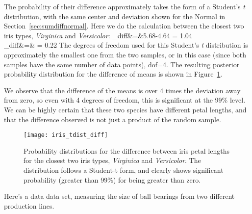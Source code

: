 The probability of their difference approximately takes the form of a Student's {\em t} distribution, with the same center and deviation shown for the Normal in Section~\ref{sec:sumdiffnormal}.  Here we do the calculation between the closest two iris types, \emph{Virginica} and \emph{Versicolor}:
\beqn
\mu_{\rm diff}&=&5.68-4.64 = 1.04 \\
\sigma_{\rm diff}&=&  = 0.22
\eeqn
The degrees of freedom used for this Student's {\em t} distribution is approximately the smallest one from the two samples, or in this case (since both samples have the same number of data points), dof=4.  The resulting posterior probability distribution for the difference of means is shown in Figure~\ref{fig:iris_tdist_diff}.  

We observe that the difference of the means is over 4 times the deviation away from zero, so even with 4 degrees of freedom, this is significant at the 99\% level. We can be highly certain that these two species have different petal lengths, and that the difference observed is not just a product of the random sample. 

\begin{figure}
\texttt{[image: iris\_tdist\_diff]}
\caption{Probability distributions for the difference between iris petal lengths for the closest two iris types, \emph{Virginica} and \emph{Versicolor}.  The distribution follows a Student-t form, and clearly shows significant probability (greater than 99\%) for being greater than zero.}
\label{fig:iris_tdist_diff}
\end{figure}




Here's a data data set, measuring the size of ball bearings\cite{hand2011handbook}  from two different production lines.

